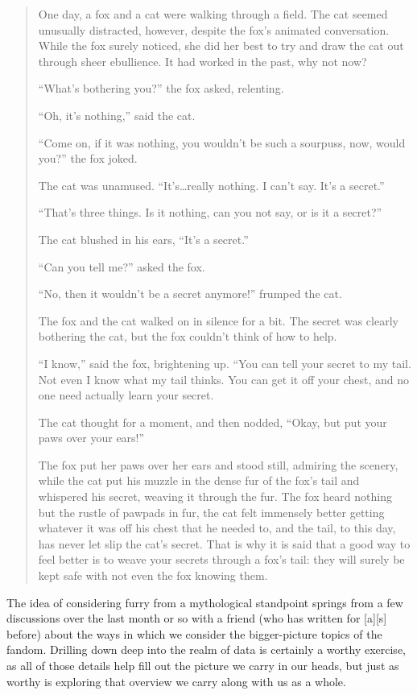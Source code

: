 
\begin{quotation}
One day, a fox and a cat were walking through a field. The cat seemed unusually distracted, however, despite the fox's animated conversation. While the fox surely noticed, she did her best to try and draw the cat out through sheer ebullience. It had worked in the past, why not now?

``What's bothering you?'' the fox asked, relenting.

``Oh, it's nothing,'' said the cat.

``Come on, if it was nothing, you wouldn't be such a sourpuss, now, would you?'' the fox joked.

The cat was unamused. ``It's\ldots{}really nothing. I can't say. It's a secret.''

``That's three things. Is it nothing, can you not say, or is it a secret?''

The cat blushed in his ears, ``It's a secret.''

``Can you tell me?'' asked the fox.

``No, then it wouldn't be a secret anymore!'' frumped the cat.

The fox and the cat walked on in silence for a bit. The secret was clearly bothering the cat, but the fox couldn't think of how to help.

``I know,'' said the fox, brightening up. ``You can tell your secret to my tail. Not even I know what my tail thinks. You can get it off your chest, and no one need actually learn your secret.

The cat thought for a moment, and then nodded, ``Okay, but put your paws over your ears!''

The fox put her paws over her ears and stood still, admiring the scenery, while the cat put his muzzle in the dense fur of the fox's tail and whispered his secret, weaving it through the fur. The fox heard nothing but the rustle of pawpads in fur, the cat felt immensely better getting whatever it was off his chest that he needed to, and the tail, to this day, has never let slip the cat's secret. That is why it is said that a good way to feel better is to weave your secrets through a fox's tail: they will surely be kept safe with not even the fox knowing them.
\end{quotation}

The idea of considering furry from a mythological standpoint springs from a few discussions over the last month or so with a friend (who has written for {[}a{]}{[}s{]} before) about the ways in which we consider the bigger-picture topics of the fandom. Drilling down deep into the realm of data is certainly a worthy exercise, as all of those details help fill out the picture we carry in our heads, but just as worthy is exploring that overview we carry along with us as a whole.

